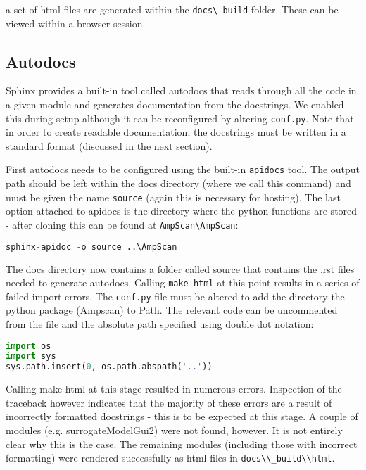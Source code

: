 \documentclass{article}
\begin{document}
a set of html files are generated within the \lstinline{docs\_build} folder. These can be viewed within a browser session.

\subsection{Autodocs}
Sphinx provides a built-in tool called autodocs that reads through all the code in a given module and generates documentation from the docstrings. We enabled this during setup although it can be reconfigured by altering \lstinline{conf.py}. Note that in order to create readable documentation, the docstrings must be written in a standard format (discussed in the next section).

First autodocs needs to be configured using the built-in \lstinline{apidocs} tool. The output path should be left within the docs directory (where we call this command) and must be given the name \lstinline{source} (again this is necessary for hosting). The last option attached to apidocs is the directory where the python functions are stored - after cloning this can be found at \lstinline{AmpScan\AmpScan}:

\begin{lstlisting}[language=Python]
sphinx-apidoc -o source ..\AmpScan
\end{lstlisting}

 The docs directory now contains a folder called source that contains the .rst files needed to generate autodocs. Calling \lstinline{make html} at this point results in a series of failed import errors. The \lstinline{conf.py} file must be altered to add the directory the python package (Ampscan) to Path. The relevant code can be uncommented from the file and the absolute path specified using double dot notation:

\begin{lstlisting}[language=Python]
import os
import sys
sys.path.insert(0, os.path.abspath('..'))
\end{lstlisting}

Calling make html at this stage resulted in numerous errors. Inspection of the traceback however indicates that the majority of these errors are a result of incorrectly formatted docstrings - this is to be expected at this stage. A couple of modules (e.g. surrogateModelGui2) were not found, however. It is not entirely clear why this is the case. The remaining modules (including those with incorrect formatting) were rendered successfully as html files in \lstinline{docs\\_build\\html}.
\end{document}
